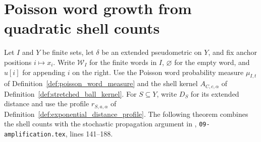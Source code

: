 \section{Poisson word growth from quadratic shell counts}
\label{sec:poisson_word_shell_growth}

Let $I$ and $Y$ be finite sets, let $\delta$ be an extended
pseudometric on $Y$, and fix anchor positions $i\mapsto x_i$.
Write $\mathcal W_I$ for the finite words in $I$, $\varnothing$
for the empty word, and $u[i]$ for appending $i$ on the right.
Use the Poisson word probability measure $\mu_{I,t}$ of
Definition~\ref{def:poisson_word_measure} and the shell kernel
$A_{C,c,\alpha}$ of Definition~\ref{def:stretched_ball_kernel}.
For $S\subseteq Y$, write $D_S$ for its extended distance and
use the profile $r_{S,a,\alpha}$ of
Definition~\ref{def:exponential_distance_profile}.
The following theorem combines the shell counts with the stochastic
propagation argument in \cite{OpenAI2026AreaLaw},
\texttt{09-amplification.tex}, lines 141--188.

